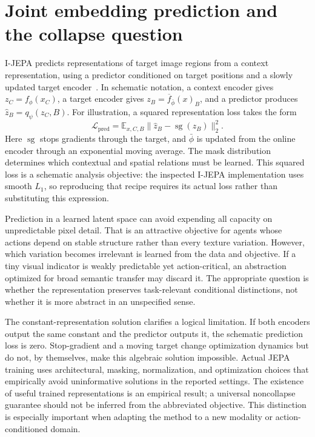 \section{Joint embedding prediction and the collapse question}
\label{sec:C05:jepa}
I-JEPA predicts representations of target image regions from a context representation, using a predictor conditioned on target positions and a slowly updated target encoder~\cite{assran2023ijepa}. In schematic notation, a context encoder gives $z_C=f_\phi(x_C)$, a target encoder gives $z_B=\overline f_{\bar\phi}(x)_B$, and a predictor produces $\widehat z_B=q_\psi(z_C,B)$. For illustration, a squared representation loss takes the form
\begin{equation}
 \mathcal L_{\mathrm{pred}}=
 \mathbb E_{x,C,B}\|\widehat z_B-
 \operatorname{sg}(z_B)\|_2^2.
\end{equation}
Here $\operatorname{sg}$ stops gradients through the target, and $\bar\phi$ is updated from the online encoder through an exponential moving average. The mask distribution determines which contextual and spatial relations must be learned. This squared loss is a schematic analysis objective: the inspected I-JEPA implementation uses smooth $L_1$, so reproducing that recipe requires its actual loss rather than substituting this expression.

Prediction in a learned latent space can avoid expending all capacity on unpredictable pixel detail. That is an attractive objective for agents whose actions depend on stable structure rather than every texture variation. However, which variation becomes irrelevant is learned from the data and objective. If a tiny visual indicator is weakly predictable yet action-critical, an abstraction optimized for broad semantic transfer may discard it. The appropriate question is whether the representation preserves task-relevant conditional distinctions, not whether it is more abstract in an unspecified sense.

The constant-representation solution clarifies a logical limitation. If both encoders output the same constant and the predictor outputs it, the schematic prediction loss is zero. Stop-gradient and a moving target change optimization dynamics but do not, by themselves, make this algebraic solution impossible. Actual JEPA training uses architectural, masking, normalization, and optimization choices that empirically avoid uninformative solutions in the reported settings. The existence of useful trained representations is an empirical result; a universal noncollapse guarantee should not be inferred from the abbreviated objective. This distinction is especially important when adapting the method to a new modality or action-conditioned domain.

